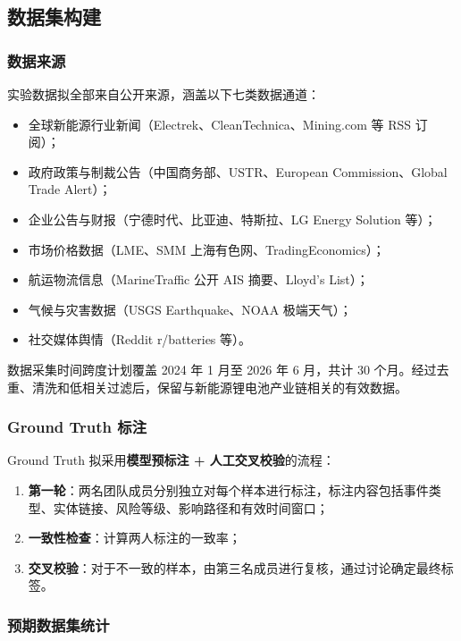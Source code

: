 \documentclass[12pt,a4paper]{article}
\newcommand{\term}[1]{\textbf{#1}}
\begin{document}
\subsection{数据集构建}
\label{sec:exp-dataset}

\subsubsection{数据来源}

实验数据拟全部来自公开来源，涵盖以下七类数据通道：
\begin{itemize}
    \item 全球新能源行业新闻（Electrek、CleanTechnica、Mining.com 等 RSS 订阅）；
    \item 政府政策与制裁公告（中国商务部、USTR、European Commission、Global Trade Alert）；
    \item 企业公告与财报（宁德时代、比亚迪、特斯拉、LG Energy Solution 等）；
    \item 市场价格数据（LME、SMM 上海有色网、TradingEconomics）；
    \item 航运物流信息（MarineTraffic 公开 AIS 摘要、Lloyd's List）；
    \item 气候与灾害数据（USGS Earthquake、NOAA 极端天气）；
    \item 社交媒体舆情（Reddit r/batteries 等）。
\end{itemize}

数据采集时间跨度计划覆盖 2024 年 1 月至 2026 年 6 月，共计 30 个月。经过去重、清洗和低相关过滤后，保留与新能源锂电池产业链相关的有效数据。

\subsubsection{Ground Truth 标注}

Ground Truth 拟采用\textbf{模型预标注 + 人工交叉校验}的流程：
\begin{enumerate}
    \item \term{第一轮}：两名团队成员分别独立对每个样本进行标注，标注内容包括事件类型、实体链接、风险等级、影响路径和有效时间窗口；
    \item \term{一致性检查}：计算两人标注的一致率；
    \item \term{交叉校验}：对于不一致的样本，由第三名成员进行复核，通过讨论确定最终标签。
\end{enumerate}

\subsubsection{预期数据集统计}
\end{document}
